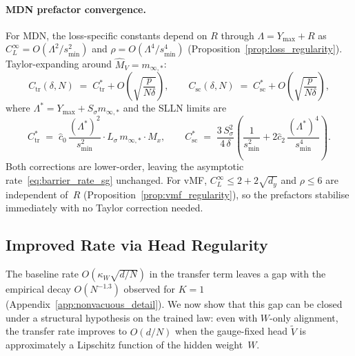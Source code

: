 \documentclass[11pt]{article}
\begin{document}
\paragraph{MDN prefactor convergence.}
For MDN, the loss-specific constants depend on $R$ through
$\Lambda = Y_{\max} + R$ as
$C_L^\infty = O(\Lambda^2/s_{\min}^2)$ and
$\rho = O(\Lambda^4/s_{\min}^4)$
(Proposition~\ref{prop:loss_regularity}).
Taylor-expanding around $\hat M_V = m_{\infty,*}$:
\begin{equation}\label{eq:Ctr_rate}
  C_{\mathrm{tr}}(\delta,N)
  \;=\; C_{\mathrm{tr}}^*
  + O\!\left(\sqrt{\frac{p}{N\delta}}\right),
  \qquad
  C_{\mathrm{sc}}(\delta,N)
  \;=\; C_{\mathrm{sc}}^*
  + O\!\left(\sqrt{\frac{p}{N\delta}}\right),
\end{equation}
where $\Lambda^* = Y_{\max} + S_\sigma m_{\infty,*}$ and
the SLLN limits are
\begin{equation}\label{eq:prefactor_limits}
  C_{\mathrm{tr}}^*
  \;=\; \hat c_0\,\frac{(\Lambda^*)^2}{s_{\min}^2}
        \cdot L_\sigma\,m_{\infty,*}
        \cdot M_x,
  \qquad
  C_{\mathrm{sc}}^*
  \;=\; \frac{3\,S_\sigma^2}{4\,\delta}
        \!\left(\frac{1}{s_{\min}^2}
        + 2\hat c_2\,\frac{(\Lambda^*)^4}{s_{\min}^4}\right).
\end{equation}
Both corrections are lower-order, leaving the asymptotic
rate~\eqref{eq:barrier_rate_sg} unchanged.
For vMF, $C_L^\infty \le 2 + 2\sqrt{d_y}$ and $\rho \le 6$
are independent of~$R$ (Proposition~\ref{prop:vmf_regularity}),
so the prefactors stabilise immediately with no Taylor correction
needed.

\subsection{Improved Rate via Head Regularity}
\label{sec:head_regularity}

The baseline rate $O(\kappa_W\sqrt{d/N})$ in the transfer term
leaves a gap with the empirical decay $O(N^{-1.3})$ observed for
$K=1$ (Appendix~\ref{app:nonvacuous_detail}).
We now show that this gap can be closed under
a structural hypothesis on the trained law:
even with $W$-only alignment, the transfer rate improves to
$O(d/N)$ when the gauge-fixed head $\tilde V$ is approximately
a Lipschitz function of the hidden weight~$W$.
\end{document}
